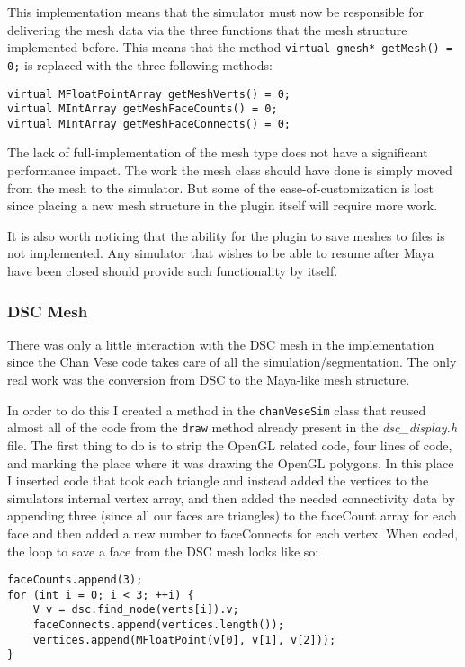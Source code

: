 
This implementation means that the simulator must now be responsible for
delivering the mesh data via the three functions that the mesh structure implemented
before. This means that the method \texttt{virtual gmesh* getMesh() = 0;} is
replaced with the three following methods:
\begin{lstlisting}
virtual MFloatPointArray getMeshVerts() = 0;
virtual MIntArray getMeshFaceCounts() = 0;
virtual MIntArray getMeshFaceConnects() = 0;
\end{lstlisting}

The lack of full-implementation of the mesh type does not have a significant
performance impact. The work the mesh class should have done is simply moved
from the mesh to the simulator. But some of the ease-of-customization is lost
since placing a new mesh structure in the plugin itself will require more work.

It is also worth noticing that the ability for the plugin to save meshes to files
is not implemented. Any simulator that wishes to be able to resume after Maya
have been closed should provide such functionality by itself.

\subsubsection{DSC Mesh}
There was only a little interaction with the DSC mesh in the implementation
since the Chan Vese code takes care of all the simulation/segmentation. The only
real work was the conversion from DSC to the Maya-like mesh structure.

In order to do this I created a method in the \texttt{chanVeseSim} class that
reused almost all of the code from the \texttt{draw} method already present in
the \textit{dsc\_display.h} file. The first thing to do is to strip the OpenGL
related code, four lines of code, and marking the place where it was
drawing the OpenGL polygons. In this place I inserted code that took each
triangle and instead added the vertices to the simulators internal vertex array,
and then added the needed connectivity data by appending three (since all our faces
are triangles) to the faceCount array for each face and then added a new number
to faceConnects for each vertex. When coded, the loop to save a face from the
DSC mesh looks like so:
\begin{lstlisting}
faceCounts.append(3);
for (int i = 0; i < 3; ++i) {
    V v = dsc.find_node(verts[i]).v;
    faceConnects.append(vertices.length());
    vertices.append(MFloatPoint(v[0], v[1], v[2]));
}
\end{lstlisting}

